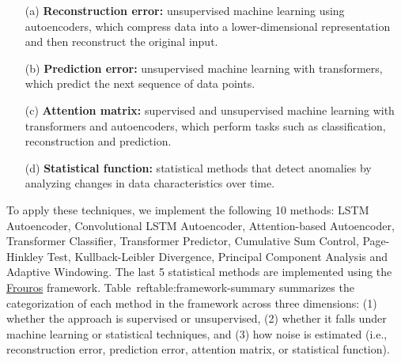 \begin{enumerate}
    \item[(a)] \textbf{Reconstruction error:} unsupervised machine learning using autoencoders, which compress data into a lower-dimensional representation and then reconstruct the original input.
    \vspace{-0.4cm}
    \item[(b)] \textbf{Prediction error:} unsupervised machine learning with transformers, which predict the next sequence of data points.
    \vspace{-0.4cm}
    \item[(c)] \textbf{Attention matrix:} supervised and unsupervised machine learning with transformers and autoencoders, which perform tasks such as classification, reconstruction and prediction.
    \vspace{-0.4cm}
    \item[(d)] \textbf{Statistical function:} statistical methods that detect anomalies by analyzing changes in data characteristics over time.
\end{enumerate}

To apply these techniques, we implement the following 10 methods: LSTM Autoencoder, Convolutional LSTM Autoencoder, Attention-based Autoencoder, Transformer Classifier, Transformer Predictor, Cumulative Sum Control, Page-Hinkley Test, Kullback-Leibler Divergence, Principal Component Analysis and Adaptive Windowing. The last 5 statistical methods are implemented using the \href{https://github.com/IFCA-Advanced-Computing/frouros}{Frouros} framework. Table~ref{table:framework-summary} summarizes the categorization of each method in the framework across three dimensions: (1) whether the approach is supervised or unsupervised, (2) whether it falls under machine learning or statistical techniques, and (3) how noise is estimated (i.e., reconstruction error, prediction error, attention matrix, or statistical function).

